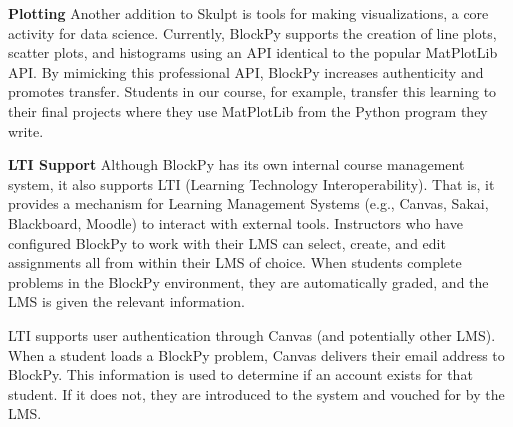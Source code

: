 \documentclass[10pt,journal,compsoc]{IEEEtran}
\begin{document}
\medskip
\textbf{Plotting}
Another addition to Skulpt is tools for making visualizations, a core activity for data science.
Currently, BlockPy supports the creation of line plots, scatter plots, and histograms using an API identical to the popular MatPlotLib API.%
By mimicking this professional API, BlockPy increases authenticity and promotes transfer.
Students in our course, for example, transfer this learning to their final projects where they use MatPlotLib from the Python program they write.



\medskip
\textbf{LTI Support}
Although BlockPy has its own internal course management system, it also supports LTI (Learning Technology Interoperability). 
That is, it provides a mechanism for Learning Management Systems (e.g., Canvas, Sakai, Blackboard, Moodle) to interact with external tools.
Instructors who have configured BlockPy to work with their LMS can select, create, and edit assignments all from within their LMS of choice.
When students complete problems in the BlockPy environment, they are automatically graded, and the LMS is given the relevant information.

LTI supports user authentication through Canvas (and potentially other LMS).
When a student loads a BlockPy problem, Canvas delivers their email address to BlockPy.
This information is used to determine if an account exists for that student.
If it does not, they are introduced to the system and vouched for by the LMS.



\end{document}
